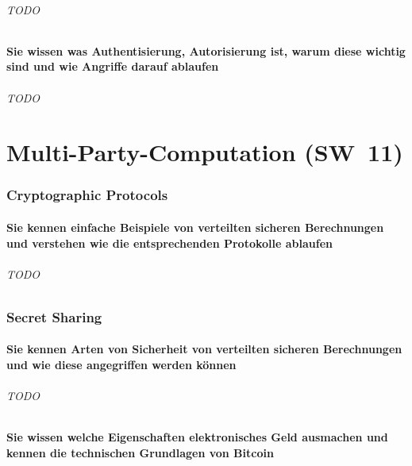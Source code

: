 \documentclass[10pt,a4paper]{article}
\begin{document}
\paragraph*{TODO}

\subsection*{Sie wissen was Authentisierung, Autorisierung ist, warum diese wichtig sind und wie Angriffe darauf ablaufen}
\paragraph*{TODO}


\part{Multi-Party-Computation (SW~11)}
\section{Cryptographic Protocols}
\subsection*{Sie kennen einfache Beispiele von verteilten sicheren Berechnungen und verstehen wie die entsprechenden Protokolle ablaufen}
\paragraph*{TODO}

\section{Secret Sharing}
\subsection*{Sie kennen Arten von Sicherheit von verteilten sicheren Berechnungen und wie diese angegriffen werden können}
\paragraph*{TODO}

\subsection*{Sie wissen welche Eigenschaften elektronisches Geld ausmachen und kennen die technischen Grundlagen von Bitcoin}
\end{document}
